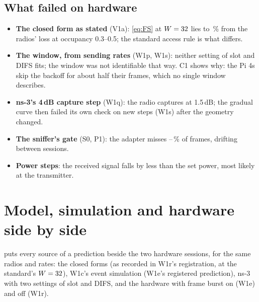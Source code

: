 \documentclass[11pt,a4paper]{article}
\begin{document}
\subsection{What failed on hardware}

\begin{itemize}
\item \textbf{The closed form as stated} (V1a): \eqref{eq:FS} at $W=32$ lies \vaErrB{} to
\vaErrA\,\% from the radios' loss at occupancy 0.3--0.5; the standard access rule is what differs.
\item \textbf{The window, from sending rates} (W1p, W1s): neither setting of slot and DIFS fits; the
window was not identifiable that way. C1 shows why: the Pi 4s skip the backoff for about half their
frames, which no single window describes.
\item \textbf{ns-3's 4\,dB capture step} (W1q): the radio captures at 1.5\,dB; the gradual curve
then failed its own check on new steps (W1s) after the geometry changed.
\item \textbf{The sniffer's gate} (S0, P1): the adapter misses \snifMissMin--\snifMissMax\,\% of frames, drifting between
sessions.
\item \textbf{Power steps}: the received signal falls by less than the set power, most likely at the
transmitter.
\end{itemize}

\section{Model, simulation and hardware side by side}\label{sec:side}

 puts every source of a prediction beside the two hardware sessions, for the same
radios and rates: the closed forms (as recorded in W1r's registration, at the standard's
$W=32$), W1c's event simulation (W1e's registered prediction), ns-3 with two settings of slot and
DIFS, and the hardware with frame burst on (W1e) and off (W1r).

\begin{table}[htbp]
\centering\footnotesize

\caption{Loss (\%) of two and three radios, 802.11b at 1\,Mb/s, $f$ frames per second per radio.
For the pairs, \eqref{eq:G5} and \eqref{eq:G25} lie outside their stated range (two stations;
\eqref{eq:G25} needs 8 or more others); the finite-station form is shown only where it was accepted
(three stations, occupancy 0.5). The ns-3 values for the pairs with the Pi 3 use its inferred window
of \wrWinPiThree{} slots.}
\label{tab:threeway}
\end{table}
\end{document}

